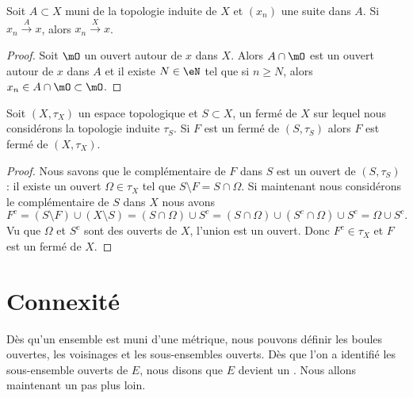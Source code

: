 \begin{lemma}   \label{LemPESaiVw}
    Soit \( A\subset X\) muni de la topologie induite de \( X\) et \( (x_n)\) une suite dans \( A\). Si \( x_n\stackrel{A}{\longrightarrow}x\), alors \( x_n\stackrel{X}{\longrightarrow}x\). 
\end{lemma}

\begin{proof}
    Soit \( \mO\) un ouvert autour de \( x\) dans \( X\). Alors \( A\cap\mO\) est un ouvert autour de \( x\) dans \( A\) et il existe \( N\in \eN\) tel que si \( n\geq N\), alors \( x_n\in A\cap\mO\subset\mO\).
\end{proof}

\begin{lemma}        \label{LemBWSUooCCGvax}
    Soit \( (X,\tau_X)\) un espace topologique et \( S\subset X\), un fermé de \( X\) sur lequel nous considérons la topologie induite \( \tau_S\). Si \( F\) est un fermé de \( (S,\tau_S)\) alors \( F\) est fermé de \( (X,\tau_X)\).
\end{lemma}

\begin{proof}
    Nous savons que le complémentaire de \( F\) dans \( S\) est un ouvert de \( (S,\tau_S)\) : il existe un ouvert \( \Omega\in \tau_X\) tel que \( S\setminus F=S\cap \Omega\). Si maintenant nous considérons le complémentaire de \( S\) dans \( X\) nous avons
    \begin{equation}
        F^c=(S\setminus F)\cup (X\setminus S)=(S\cap \Omega)\cup S^c=(S\cap \Omega)\cup(S^c\cap \Omega)\cup S^c=\Omega\cup S^c.
    \end{equation}
    Vu que \( \Omega\) et \( S^c\) sont des ouverts de \( X\), l'union est un ouvert. Donc \( F^c\in \tau_X\) et \( F\) est un fermé de \( X\).
\end{proof}

\section{Connexité}

Dès qu'un ensemble est muni d'une métrique, nous pouvons définir les boules ouvertes, les voisinages et les sous-ensembles ouverts. Dès que l'on a identifié les sous-ensemble ouverts de $E$, nous disons que $E$ devient un . Nous allons maintenant un pas plus loin.

